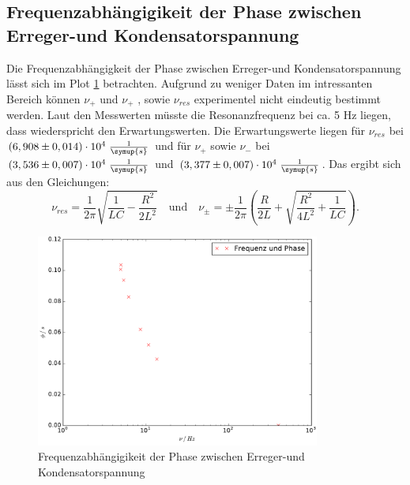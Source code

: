   \subsection{Frequenzabhängigikeit der Phase zwischen Erreger-und Kondensatorspannung}
  Die Frequenzabhängigkeit der Phase zwischen Erreger-und Kondensatorspannung
   lässt sich im Plot \ref{fig:5dplot} betrachten.
  Aufgrund zu weniger Daten im intressanten Bereich
  können $\nu_+$ und $\nu_+$ , sowie $\nu_{res}$
  experimentel nicht eindeutig bestimmt werden. Laut den Messwerten
  müsste die Resonanzfrequenz bei ca. 5 Hz liegen, dass wiederspricht den
  Erwartungswerten.
  Die Erwartungswerte liegen für $\nu_{res}$ bei $(6,908 \pm 0,014)\cdot10^4 \;
  \frac{1}{\symup{s}}$
  und für $\nu_+$ sowie $\nu_-$ bei
  $(3,536 \pm 0,007)\cdot10^4\;\frac{1}{\symup{s}}$ \;und\; $(3,377 \pm 0,007)\cdot10^4
  \;\frac{1}{\symup{s}}$.
  Das ergibt sich aus den Gleichungen:
  \begin{equation*}
    \nu_{res} = \frac{1}{2\pi}\sqrt{\frac{1}{LC} - \frac{R^2 }{2L^2}}
    \quad \text{und} \quad
    \nu_{\pm} = \pm \frac{1}{2\pi} \left(\frac{R}{2L}
    + \sqrt{\frac{R^2}{4L^2} + \frac{1}{LC}}\right).
  \end{equation*}

    \begin{figure}
      \centering
      \includegraphics[height=7cm]{./logos/5dplot.pdf}
        \caption{Frequenzabhängigikeit der Phase zwischen Erreger-und Kondensatorspannung}
        \label{fig:5dplot}
      \end{figure}

